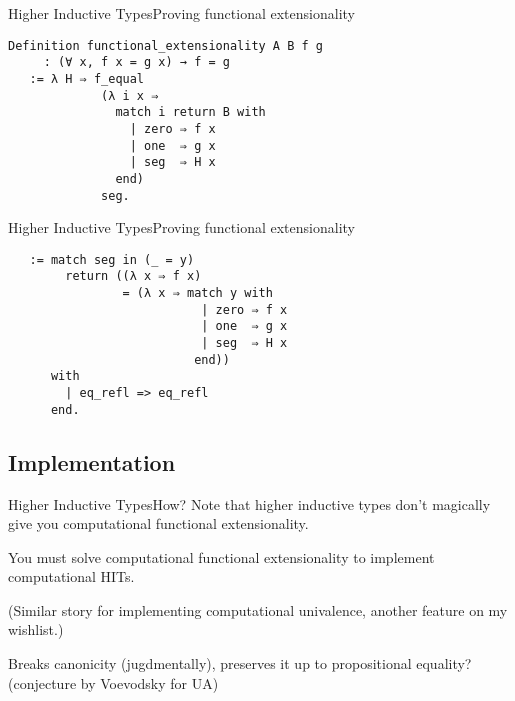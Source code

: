 \documentclass{beamer}
\begin{document}
\begin{frame}[fragile]{Higher Inductive Types}{Proving functional extensionality}
  \Large
\begin{verbatim}
Definition functional_extensionality A B f g
     : (∀ x, f x = g x) → f = g
   := λ H ⇒ f_equal
             (λ i x ⇒
               match i return B with
                 | zero ⇒ f x
                 | one  ⇒ g x
                 | seg  ⇒ H x
               end)
             seg.
\end{verbatim}
\end{frame}

\begin{frame}[fragile]{Higher Inductive Types}{Proving functional extensionality}
  \Large
\begin{verbatim}
   := match seg in (_ = y)
        return ((λ x ⇒ f x)
                = (λ x ⇒ match y with
                           | zero ⇒ f x
                           | one  ⇒ g x
                           | seg  ⇒ H x
                          end))
      with
        | eq_refl => eq_refl
      end.
\end{verbatim}
\end{frame}

\subsection{Implementation}

\begin{frame}{Higher Inductive Types}{How?}
  \Large
  Note that higher inductive types don't magically give you computational functional extensionality. \pause
  
  You must solve computational functional extensionality to implement computational HITs. \pause
  
  (Similar story for implementing computational univalence, another feature on my wishlist.) \pause
  
  Breaks canonicity \pause (jugdmentally), \pause preserves it up to propositional equality? {\normalsize (conjecture by Voevodsky for UA)}
\end{frame}
\end{document}
